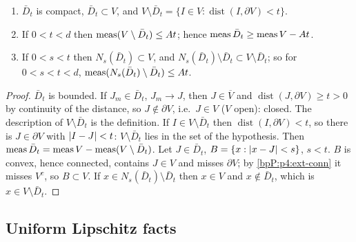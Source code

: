 \begin{lemma}[Collar]\label{bpP:p4:collar}
\begin{enumerate}[label=(\alph*)]
\item $\bar D_t$ is compact, $\bar D_t\subset V$, and $V\setminus\bar D_t=\{I\in V:\operatorname{dist}(I,\partial V)<t\}$.
\item If $0<t<d$ then $\operatorname{meas}(V\setminus\bar D_t)\le At$; hence $\operatorname{meas}\bar D_t\ge\operatorname{meas} V-At$.
\item If $0<s<t$ then $N_s(\bar D_t)\subset V$, and $N_s(\bar D_t)\setminus\bar D_t\subset V\setminus\bar D_t$; so for $0<s<t<d$, $\operatorname{meas}(N_s(\bar D_t)\setminus\bar D_t)\le At$.
\end{enumerate}
\end{lemma}
\begin{proof}
\label{stepP:p4:co-compact}
$\bar D_t$ is bounded. If $J_m\in\bar D_t$, $J_m\to J$, then $J\in\overline V$ and $\operatorname{dist}(J,\partial V)\ge t>0$ by continuity of the distance, so $J\notin\partial V$, i.e.\ $J\in V$ ($V$ open): closed. The description of $V\setminus\bar D_t$ is the definition.
\label{stepP:p4:co-meas}
If $I\in V\setminus\bar D_t$ then $\operatorname{dist}(I,\partial V)<t$, so there is $J\in\partial V$ with $\lvert I-J\rvert<t$: $V\setminus\bar D_t$ lies in the set of the hypothesis. Then $\operatorname{meas}\bar D_t=\operatorname{meas} V-\operatorname{meas}(V\setminus\bar D_t)$.
\label{stepP:p4:co-nbhd}
Let $J\in\bar D_t$, $B=\{x:\lvert x-J\rvert<s\}$, $s<t$. $B$ is convex, hence connected, contains $J\in V$ and misses $\partial V$; by \ref{bpP:p4:ext-conn} it misses $V^c$, so $B\subset V$. If $x\in N_s(\bar D_t)\setminus\bar D_t$ then $x\in V$ and $x\notin\bar D_t$, which is $x\in V\setminus\bar D_t$.
\end{proof}

\subsection{Uniform Lipschitz facts}\label{bpP:p4:s-lip}

